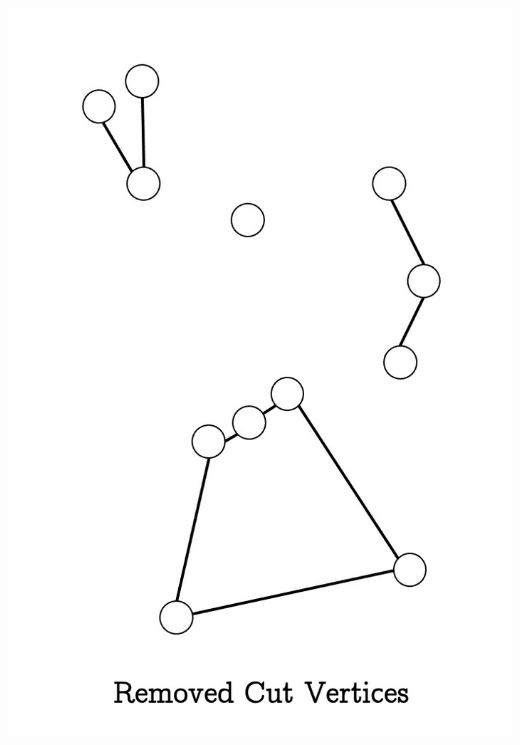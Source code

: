 \documentclass[unknownkeysallowed]{beamer}
\begin{document}
\begin{frame}
\centering\includegraphics[height=0.9\textheight]{assets/eg-cutvertex/2}
\end{frame}

\end{document}
